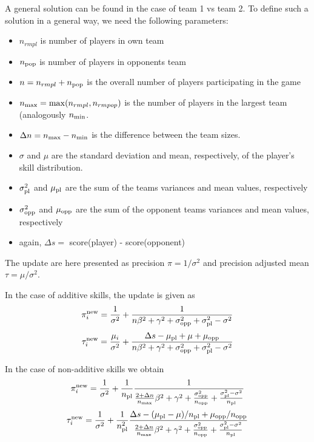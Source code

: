 \documentclass{article}
\begin{document}
A general solution can be found in the case of team 1 vs team 2. To define such a solution in a general way, we need the following parameters:
\begin{itemize}
\item $n_{rm pl}$ is number of players in own team
\item $n_{\rm pop}$ is number of players in opponents team
\item $ n = n_{rm pl} + n_{\rm pop}$ is the overall number of players participating in the game
\item $n_{\rm max} = \max(n_{rm pl},n_{rm pop})$ is the number of players in the largest team (analogously $n_{\rm min}$.
\item $\Delta n = n_{\rm max} - n_{\rm min}$ is the difference between the team sizes. 
\item $\sigma$ and $\mu$ are the standard deviation and mean, respectively, of the player's skill distribution. 
\item $\sigma_{\rm pl}^2 $ and $\mu_{\rm pl}$ are the sum of the teams variances and mean values, respectively
\item $\sigma_{\rm opp}^2 $ and $\mu_{\rm opp}$ are the sum of the opponent teams variances and mean values, respectively
\item again, $\Delta s = $ score(player) - score(opponent)
\end{itemize}

The update are here presented as precision $\pi = 1/\sigma^2$ and precision adjusted mean $\tau = \mu/\sigma^2$. 


In the case of additive skills, the update is given as 
\begin{equation}
\pi_i^{\rm new} = \frac{1}{\sigma^2} +  \frac{1}{n \beta^2 + \gamma^2 + \sigma_{\rm opp}^2 + \sigma_{\rm pl}^2 - \sigma^2 }
\end{equation}
\begin{equation}
\tau_i^{\rm new} = \frac{\mu_i}{\sigma^2} +  \frac{\Delta s - \mu_{\rm pl} + \mu + \mu_{\rm opp}}{n \beta^2 + \gamma^2 + \sigma_{\rm opp}^2 + \sigma_{\rm pl}^2 - \sigma^2 }
\end{equation}



In the case of non-additive skills we obtain
\begin{equation}
\pi_i^{\rm new} = \frac{1}{\sigma^2} + \frac{1}{n_{\rm pl}} \frac{1}{\frac{2 + \Delta n}{n_{\rm max}} \beta^2 + \gamma^2 + \frac{\sigma_{\rm opp}^2}{n_{\rm opp}} + \frac{\sigma_{\rm pl}^2 - \sigma^2}{n_{\rm pl}}}
\end{equation}
\begin{equation}
\tau_i^{\rm new} = \frac{1}{\sigma^2} + \frac{1}{n_{\rm pl}^2} \frac{\Delta s - (\mu_{\rm pl} - \mu)/n_{\rm pl} + \mu_{\rm opp}/ n_{\rm opp} }{\frac{2 + \Delta n}{n_{\rm max}} \beta^2 + \gamma^2 + \frac{\sigma_{\rm opp}^2}{n_{\rm opp}} + \frac{\sigma_{\rm pl}^2 - \sigma^2}{n_{\rm pl}}}
\end{equation}
\end{document}
